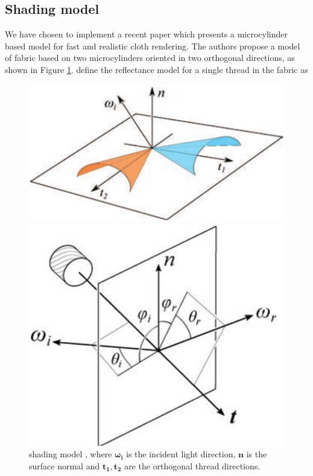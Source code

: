 \documentclass[12pt]{article}
\begin{document}
\subsection{Shading model}
\label{sec:shading_model}
We have chosen to implement a recent paper \cite{Sadeghi2013} which presents a microcylinder based model for fast and realistic cloth rendering.
The authors propose a model of fabric based on two microcylinders oriented in two orthogonal directions, as shown in Figure \ref{fig:microcylinders}.
\citeauthor{Sadeghi2013} define the reflectance model for a single thread in the fabric as

\begin{figure}[ht!]
\begin{minipage}[b]{.45\textwidth}
\centering
\includegraphics[width=1\textwidth]{images/microcylinders}
	\caption{\citeauthor{Sadeghi2013} shading model \cite{Sadeghi2013}, where $\boldsymbol{\omega_i}$ is the incident light direction, $\mathbf{n}$ is the surface normal and $\mathbf{t_1},\mathbf{t_2}$ are the orthogonal thread directions.}
	\label{fig:microcylinders}
\end{minipage}
\hfill
\begin{minipage}[b]{.45\textwidth}
\centering
\includegraphics[width=1\textwidth]{images/cloth_directions}

\end{minipage}
\end{figure}
\end{document}
